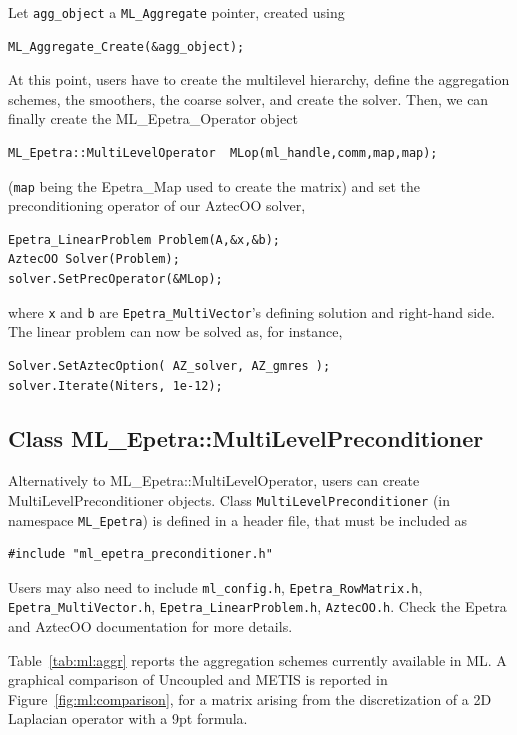 Let \verb!agg_object! a \verb!ML_Aggregate! pointer, created using
\begin{verbatim}
ML_Aggregate_Create(&agg_object);
\end{verbatim}
At this point, users have to create the multilevel hierarchy, define the
aggregation schemes, the smoothers, the coarse solver, and create the solver.
Then, we can finally create the ML\_Epetra\_Operator object
\begin{verbatim}
ML_Epetra::MultiLevelOperator  MLop(ml_handle,comm,map,map);
\end{verbatim}
(\verb!map! being the Epetra\_Map used to create the matrix) and set the
preconditioning operator of our AztecOO solver,
\begin{verbatim}
Epetra_LinearProblem Problem(A,&x,&b);
AztecOO Solver(Problem);
solver.SetPrecOperator(&MLop);
\end{verbatim}
where \verb!x! and \verb!b! are \verb!Epetra_MultiVector!'s defining
solution and right-hand side. The linear problem can now be solved as,
for instance,
\begin{verbatim}
Solver.SetAztecOption( AZ_solver, AZ_gmres );
solver.Iterate(Niters, 1e-12);
\end{verbatim}


\subsection{Class ML\_Epetra::MultiLevelPreconditioner}
\label{sec:ml:preconditioner}

Alternatively to ML\_Epetra::MultiLevelOperator, users can create
MultiLevelPreconditioner objects.  Class \verb!MultiLevelPreconditioner!
(in namespace {\tt ML\_Epetra}) is defined in a header file, that must be
included as
\begin{verbatim}
#include "ml_epetra_preconditioner.h" 
\end{verbatim}
Users may also need to include \verb!ml_config.h!,
\verb!Epetra_RowMatrix.h!, \verb!Epetra_MultiVector.h!,
\verb!Epetra_LinearProblem.h!,  \verb!AztecOO.h!. Check the Epetra and
AztecOO documentation for more details.

Table~\ref{tab:ml:aggr} reports the aggregation schemes currently
available in ML. A graphical comparison of Uncoupled and METIS is
reported in Figure~\ref{fig:ml:comparison}, for a matrix arising from
the discretization of a 2D Laplacian operator with a 9pt formula.


